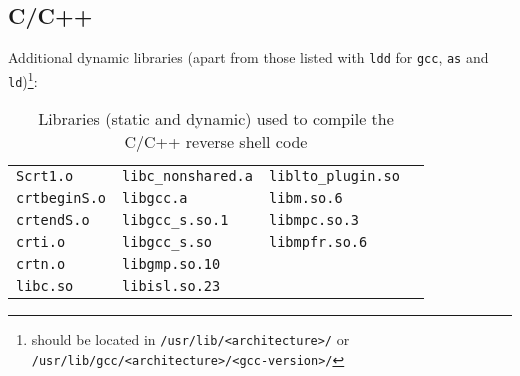 \subsection*{C/C++}


Additional dynamic libraries (apart from those listed with \texttt{ldd} for \texttt{gcc}, \texttt{as} and \texttt{ld})\footnote{should be located in \texttt{/usr/lib/<architecture>/} or \texttt{/usr/lib/gcc/<architecture>/<gcc-version>/}}:

\begin{longtable}{l l l l}
\caption{Libraries (static and dynamic) used to compile the C/C++ reverse shell code}\label{tab:c-dpd-lib} \\
\texttt{Scrt1.o} & \texttt{libc\_nonshared.a} & \texttt{liblto\_plugin.so} \\
\texttt{crtbeginS.o} & \texttt{libgcc.a} & \texttt{libm.so.6} \\
\texttt{crtendS.o} & \texttt{libgcc\_s.so.1} & \texttt{libmpc.so.3} \\
\texttt{crti.o} & \texttt{libgcc\_s.so} & \texttt{libmpfr.so.6} \\
\texttt{crtn.o} & \texttt{libgmp.so.10} &  \\
\texttt{libc.so} & \texttt{libisl.so.23} &  \\
\end{longtable}


